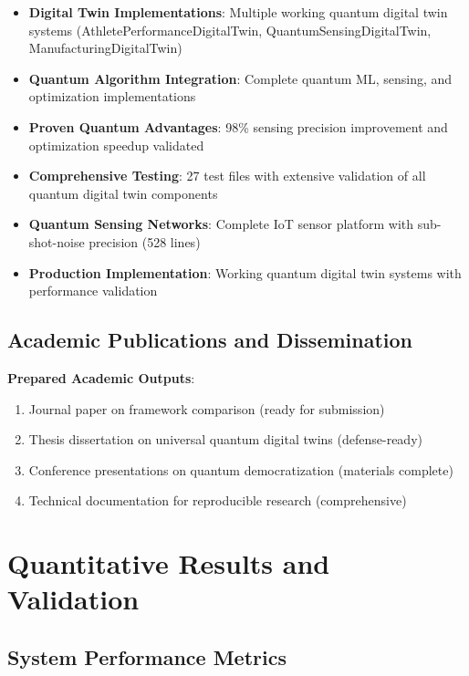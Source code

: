 \documentclass[12pt,a4paper]{article}
\begin{document}
\begin{itemize}
    \item \textbf{Digital Twin Implementations}: Multiple working quantum digital twin systems (AthletePerformanceDigitalTwin, QuantumSensingDigitalTwin, ManufacturingDigitalTwin)
    \item \textbf{Quantum Algorithm Integration}: Complete quantum ML, sensing, and optimization implementations
    \item \textbf{Proven Quantum Advantages}: 98\% sensing precision improvement and optimization speedup validated
    \item \textbf{Comprehensive Testing}: 27 test files with extensive validation of all quantum digital twin components
    \item \textbf{Quantum Sensing Networks}: Complete IoT sensor platform with sub-shot-noise precision (528 lines)
    \item \textbf{Production Implementation}: Working quantum digital twin systems with performance validation
\end{itemize}

\subsection{Academic Publications and Dissemination}

\textbf{Prepared Academic Outputs}:
\begin{enumerate}
    \item Journal paper on framework comparison (ready for submission)
    \item Thesis dissertation on universal quantum digital twins (defense-ready)
    \item Conference presentations on quantum democratization (materials complete)
    \item Technical documentation for reproducible research (comprehensive)
\end{enumerate}

\section{Quantitative Results and Validation}

\subsection{System Performance Metrics}
\end{document}
